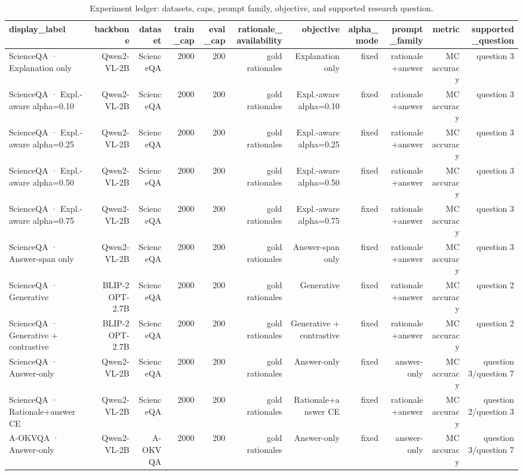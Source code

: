 \begin{table}
\caption{Experiment ledger: datasets, caps, prompt family, objective, and supported research question.}
\label{tab:experiment_ledger}
\begin{tabular}{lrrrrrrrrrr}
\toprule
display_label & backbone & dataset & train_cap & eval_cap & rationale_availability & objective & alpha_mode & prompt_family & metric & supported_question \\
\midrule
ScienceQA · Explanation only & Qwen2-VL-2B & ScienceQA & 2000 & 200 & gold rationales & Explanation only & fixed & rationale+answer & MC accuracy & question 3 \\
ScienceQA · Expl.-aware alpha=0.10 & Qwen2-VL-2B & ScienceQA & 2000 & 200 & gold rationales & Expl.-aware alpha=0.10 & fixed & rationale+answer & MC accuracy & question 3 \\
ScienceQA · Expl.-aware alpha=0.25 & Qwen2-VL-2B & ScienceQA & 2000 & 200 & gold rationales & Expl.-aware alpha=0.25 & fixed & rationale+answer & MC accuracy & question 3 \\
ScienceQA · Expl.-aware alpha=0.50 & Qwen2-VL-2B & ScienceQA & 2000 & 200 & gold rationales & Expl.-aware alpha=0.50 & fixed & rationale+answer & MC accuracy & question 3 \\
ScienceQA · Expl.-aware alpha=0.75 & Qwen2-VL-2B & ScienceQA & 2000 & 200 & gold rationales & Expl.-aware alpha=0.75 & fixed & rationale+answer & MC accuracy & question 3 \\
ScienceQA · Answer-span only & Qwen2-VL-2B & ScienceQA & 2000 & 200 & gold rationales & Answer-span only & fixed & rationale+answer & MC accuracy & question 3 \\
ScienceQA · Generative & BLIP-2 OPT-2.7B & ScienceQA & 2000 & 200 & gold rationales & Generative & fixed & rationale+answer & MC accuracy & question 2 \\
ScienceQA · Generative + contrastive & BLIP-2 OPT-2.7B & ScienceQA & 2000 & 200 & gold rationales & Generative + contrastive & fixed & rationale+answer & MC accuracy & question 2 \\
ScienceQA · Answer-only & Qwen2-VL-2B & ScienceQA & 2000 & 200 & gold rationales & Answer-only & fixed & answer-only & MC accuracy & question 3/question 7 \\
ScienceQA · Rationale+answer CE & Qwen2-VL-2B & ScienceQA & 2000 & 200 & gold rationales & Rationale+answer CE & fixed & rationale+answer & MC accuracy & question 2/question 3 \\
A-OKVQA · Answer-only & Qwen2-VL-2B & A-OKVQA & 2000 & 200 & gold rationales & Answer-only & fixed & answer-only & MC accuracy & question 3/question 7 \\

\end{tabular}
\end{table}
